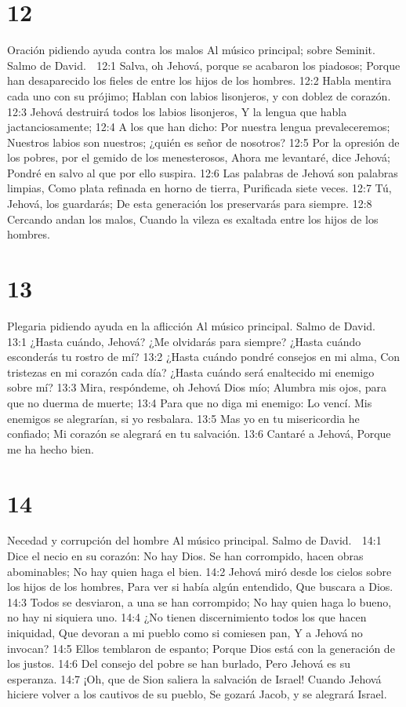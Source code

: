 \chapter{12}

Oración pidiendo ayuda contra los malos 
Al músico principal; sobre Seminit. Salmo de David. 

12:1 Salva, oh Jehová, porque se acabaron los piadosos; 
Porque han desaparecido los fieles de entre los hijos de los hombres. 
12:2 Habla mentira cada uno con su prójimo; 
Hablan con labios lisonjeros, y con doblez de corazón. 
12:3 Jehová destruirá todos los labios lisonjeros, 
Y la lengua que habla jactanciosamente; 
12:4 A los que han dicho: Por nuestra lengua prevaleceremos; 
Nuestros labios son nuestros; ¿quién es señor de nosotros? 
12:5 Por la opresión de los pobres, por el gemido de los menesterosos, 
Ahora me levantaré, dice Jehová; 
Pondré en salvo al que por ello suspira. 
12:6 Las palabras de Jehová son palabras limpias, 
Como plata refinada en horno de tierra, 
Purificada siete veces. 
12:7 Tú, Jehová, los guardarás; 
De esta generación los preservarás para siempre. 
12:8 Cercando andan los malos, 
Cuando la vileza es exaltada entre los hijos de los hombres. 

\chapter{13}

Plegaria pidiendo ayuda en la aflicción 
Al músico principal. Salmo de David. 

13:1 ¿Hasta cuándo, Jehová? ¿Me olvidarás para siempre? 
¿Hasta cuándo esconderás tu rostro de mí? 
13:2 ¿Hasta cuándo pondré consejos en mi alma, 
Con tristezas en mi corazón cada día? 
¿Hasta cuándo será enaltecido mi enemigo sobre mí? 
13:3 Mira, respóndeme, oh Jehová Dios mío; 
Alumbra mis ojos, para que no duerma de muerte; 
13:4 Para que no diga mi enemigo: Lo vencí. 
Mis enemigos se alegrarían, si yo resbalara. 
13:5 Mas yo en tu misericordia he confiado; 
Mi corazón se alegrará en tu salvación. 
13:6 Cantaré a Jehová, 
Porque me ha hecho bien. 

\chapter{14}

Necedad y corrupción del hombre 
Al músico principal. Salmo de David. 

14:1 Dice el necio en su corazón: 
No hay Dios. 
Se han corrompido, hacen obras abominables; 
No hay quien haga el bien. 
14:2 Jehová miró desde los cielos sobre los hijos de los hombres, 
Para ver si había algún entendido, 
Que buscara a Dios. 
14:3 Todos se desviaron, a una se han corrompido; 
No hay quien haga lo bueno, no hay ni siquiera uno. 
14:4 ¿No tienen discernimiento todos los que hacen iniquidad, 
Que devoran a mi pueblo como si comiesen pan, 
Y a Jehová no invocan? 
14:5 Ellos temblaron de espanto; 
Porque Dios está con la generación de los justos. 
14:6 Del consejo del pobre se han burlado, 
Pero Jehová es su esperanza. 
14:7 ¡Oh, que de Sion saliera la salvación de Israel! 
Cuando Jehová hiciere volver a los cautivos de su pueblo, 
Se gozará Jacob, y se alegrará Israel. 

